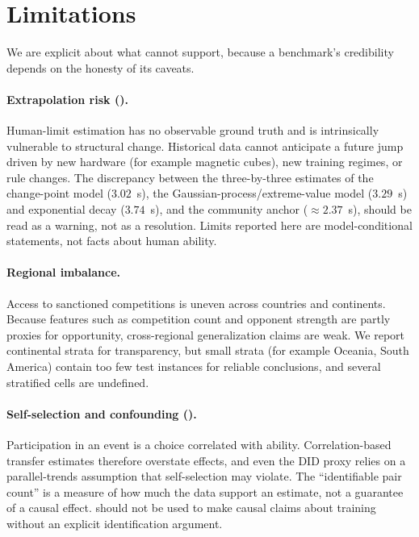 \section{Limitations}
\label{sec:limitations}

We are explicit about what \wcabench{} cannot support, because a benchmark's
credibility depends on the honesty of its caveats.

\paragraph{Extrapolation risk ().} Human-limit estimation has no
observable ground truth and is intrinsically vulnerable to structural change.
Historical data cannot anticipate a future jump driven by new hardware (for
example magnetic cubes), new training regimes, or rule changes. The
discrepancy between the three-by-three estimates of the change-point model
($3.02$~s), the Gaussian-process/extreme-value model ($3.29$~s) and exponential
decay ($3.74$~s), and the community anchor ($\approx 2.37$~s), should be read as
a warning, not as a resolution. Limits reported here are model-conditional
statements, not facts about human ability.

\paragraph{Regional imbalance.} Access to sanctioned competitions is uneven
across countries and continents. Because features such as competition count and
opponent strength are partly proxies for opportunity, cross-regional
generalization claims are weak. We report continental strata for transparency,
but small strata (for example Oceania, South America) contain too few test
instances for reliable conclusions, and several stratified cells are
undefined.

\paragraph{Self-selection and confounding ().} Participation in an
event is a choice correlated with ability. Correlation-based transfer
estimates therefore overstate effects, and even the DID proxy relies on a
parallel-trends assumption that self-selection may violate. The
``identifiable pair count'' is a measure of how much the data support an
estimate, not a guarantee of a causal effect. \wcabench{} should not be used to
make causal claims about training without an explicit identification argument.

